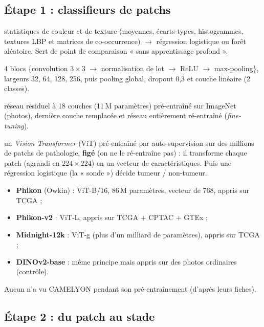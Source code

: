 \documentclass[11pt,a4paper]{article}
\begin{document}
\subsection{Étape 1 : classifieurs de patchs}
\begin{description}[style=nextline]
  \item[Référence classique] statistiques de couleur et de texture (moyennes, écarts-types, histogrammes, textures LBP et matrices de co-occurrence)
        $\to$ régression logistique ou forêt aléatoire. Sert de point de comparaison « sans apprentissage profond ».
  \item[Petit CNN (appris de zéro)] 4 blocs \{convolution $3\times3$ $\to$ normalisation de lot $\to$ ReLU $\to$ max-pooling\},
        largeurs 32, 64, 128, 256, puis pooling global, dropout 0,3 et couche linéaire (2 classes).
  \item[ResNet18 pré-entraîné] réseau résiduel à 18 couches (11\,M paramètres) pré-entraîné sur ImageNet (photos), dernière couche
        remplacée et réseau entièrement ré-entraîné (\emph{fine-tuning}).
  \item[Modèles de fondation + sonde linéaire] un \emph{Vision Transformer} (ViT) pré-entraîné par auto-supervision sur des millions
        de patchs de pathologie, \textbf{figé} (on ne le ré-entraîne pas) : il transforme chaque patch (agrandi en $224\times224$)
        en un vecteur de caractéristiques. Puis une régression logistique (la « sonde ») décide tumeur / non-tumeur.
        \begin{itemize}
          \item \textbf{Phikon} (Owkin) : ViT-B/16, 86\,M paramètres, vecteur de 768, appris sur TCGA ;
          \item \textbf{Phikon-v2} : ViT-L, appris sur TCGA + CPTAC + GTEx ;
          \item \textbf{Midnight-12k} : ViT-g (plus d'un milliard de paramètres), appris sur TCGA ;
          \item \textbf{DINOv2-base} : même principe mais appris sur des photos ordinaires (contrôle).
        \end{itemize}
        Aucun n'a vu CAMELYON pendant son pré-entraînement (d'après leurs fiches).
\end{description}

\subsection{Étape 2 : du patch au stade}
\end{document}
